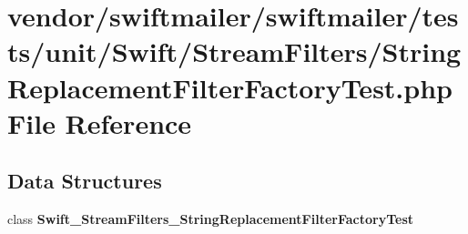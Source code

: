 \section{vendor/swiftmailer/swiftmailer/tests/unit/\+Swift/\+Stream\+Filters/\+String\+Replacement\+Filter\+Factory\+Test.php File Reference}
\label{_string_replacement_filter_factory_test_8php}
\subsection*{Data Structures}
\begin{DoxyCompactItemize}
\item 
class {\bf Swift\+\_\+\+Stream\+Filters\+\_\+\+String\+Replacement\+Filter\+Factory\+Test}
\end{DoxyCompactItemize}
